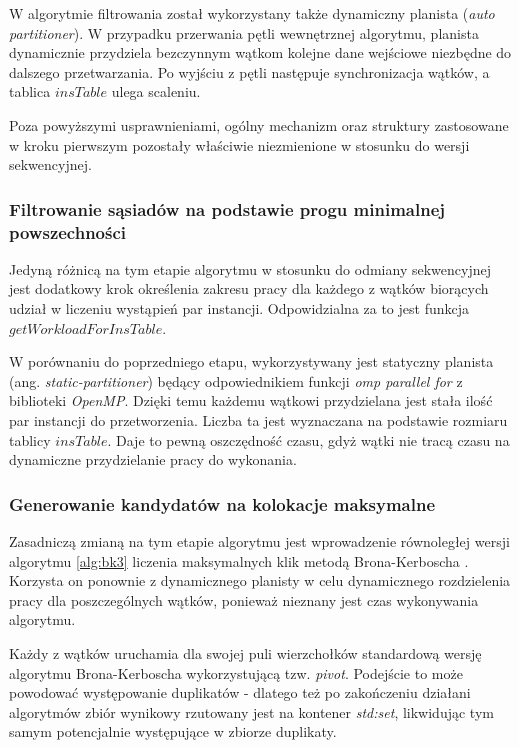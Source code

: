 \documentclass[12pt]{article}
\begin{document}
W algorytmie filtrowania został wykorzystany także dynamiczny planista (\textit{auto partitioner}). W przypadku przerwania pętli wewnętrznej algorytmu, planista dynamicznie przydziela bezczynnym wątkom kolejne dane wejściowe niezbędne do dalszego przetwarzania. Po wyjściu z pętli następuje synchronizacja wątków, a tablica $ insTable $ ulega scaleniu.

Poza powyższymi usprawnieniami, ogólny mechanizm oraz struktury zastosowane w kroku pierwszym pozostały właściwie niezmienione w stosunku do wersji sekwencyjnej.

\subsubsection{Filtrowanie sąsiadów na podstawie progu minimalnej powszechności}

Jedyną różnicą na tym etapie algorytmu w stosunku do odmiany sekwencyjnej jest dodatkowy krok określenia zakresu pracy dla każdego z wątków biorących udział w liczeniu wystąpień par instancji. Odpowidzialna za to jest funkcja $ getWorkloadForInsTable $.

W porównaniu do poprzedniego etapu, wykorzystywany jest statyczny planista (ang. \textit{static-partitioner}) będący odpowiednikiem funkcji \textit{omp parallel for} z biblioteki \textit{OpenMP}. Dzięki temu każdemu wątkowi przydzielana jest stała ilość par instancji do przetworzenia. Liczba ta jest wyznaczana na podstawie rozmiaru tablicy $ insTable $. Daje to pewną oszczędność czasu, gdyż wątki nie tracą czasu na dynamiczne przydzielanie pracy do wykonania.

\subsubsection{Generowanie kandydatów na kolokacje maksymalne}

Zasadniczą zmianą na tym etapie algorytmu jest wprowadzenie równoległej wersji algorytmu \ref{alg:bk3} liczenia maksymalnych klik metodą Brona-Kerboscha \cite{kerbosz}. Korzysta on ponownie z dynamicznego planisty w celu dynamicznego rozdzielenia pracy dla poszczególnych wątków, ponieważ nieznany jest czas wykonywania algorytmu.

Każdy z wątków uruchamia dla swojej puli wierzchołków standardową wersję algorytmu Brona-Kerboscha wykorzystującą tzw. \textit{pivot}. Podejście to może powodować występowanie duplikatów - dlatego też po zakończeniu działani algorytmów zbiór wynikowy rzutowany jest na kontener \textit{std:set}, likwidując tym samym potencjalnie występujące w zbiorze duplikaty.
\end{document}
